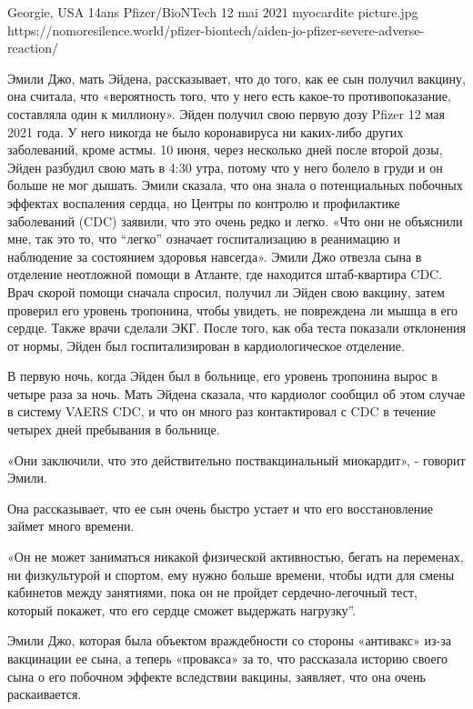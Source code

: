           {Georgie, USA}
          {14ans}
          {Pfizer/BioNTech}
          {12 mai 2021}
          {myocardite}
          {picture.jpg}
          {https://nomoresilence.world/pfizer-biontech/aiden-jo-pfizer-severe-adverse-reaction/}
          {

\normalsize

Эмили Джо, мать Эйдена, рассказывает, что до того, как ее сын получил вакцину,
она считала, что «вероятность того, что у него есть какое-то противопоказание,
составляла один к миллиону». Эйден получил свою первую дозу Pfizer 12 мая 2021
года. У него никогда не было коронавируса ни каких-либо других заболеваний,
кроме астмы. 10 июня, через несколько дней после второй дозы, Эйден разбудил
свою мать в 4:30 утра, потому что у него болело в груди и он больше не мог
дышать. Эмили сказала, что она знала о потенциальных побочных эффектах
воспаления сердца, но Центры по контролю и профилактике заболеваний (CDC)
заявили, что это очень редко и легко. «Что они не объяснили мне, так это то, что
“легко” означает госпитализацию в реанимацию и наблюдение за состоянием здоровья
навсегда». Эмили Джо отвезла сына в отделение неотложной помощи в Атланте, где
находится штаб-квартира CDC. Врач скорой помощи сначала спросил, получил ли
Эйден свою вакцину, затем проверил его уровень тропонина, чтобы увидеть, не
повреждена ли мышца в его сердце. Также врачи сделали ЭКГ. После того, как оба
теста показали отклонения от нормы, Эйден был госпитализирован в
кардиологическое отделение.

В первую ночь, когда Эйден был в больнице, его уровень тропонина вырос в четыре
раза за ночь. Мать Эйдена сказала, что кардиолог сообщил об этом случае в
систему VAERS CDC, и что он много раз контактировал с CDC в течение четырех дней
пребывания в больнице.

«Они заключили, что это действительно поствакцинальный миокардит», - говорит
Эмили.

Она рассказывает, что ее сын очень быстро устает и что его восстановление займет
много времени.

«Он не может заниматься никакой физической активностью, бегать на переменах, ни
физкультурой и спортом, ему нужно больше времени, чтобы идти для смены кабинетов
между занятиями, пока он не пройдет сердечно-легочный тест, который покажет, что
его сердце сможет выдержать нагрузку”.

Эмили Джо, которая была объектом враждебности со стороны «антивакс» из-за
вакцинации ее сына, а теперь «провакса» за то, что рассказала историю своего
сына о его побочном эффекте вследствии вакцины, заявляет, что она очень
раскаивается.

}
